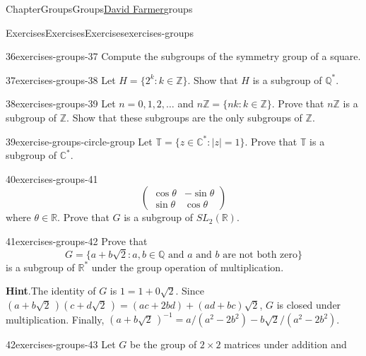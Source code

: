 \documentclass[oneside,10pt,]{book}
\newcommand{\blocktitlefont}{\relax}
\numberwithin{equation}{section}
\begin{document}
\begin{chapterptx}{Chapter}{Groups}{}{Groups}{\hyperlink{dfarmer}{David Farmer}}{}{groups}
\begin{exercises-section}{Exercises}{Exercises}{}{Exercises}{}{}{exercises-groups}
\begin{divisionexercise}{36}{}{}{exercises-groups-37}
Compute the subgroups of the symmetry group of a square.%
\end{divisionexercise}%
\begin{divisionexercise}{37}{}{}{exercises-groups-38}%
Let \(H = \{2^k : k \in {\mathbb Z} \}\). Show that \(H\) is a subgroup of \({\mathbb Q}^*\).%
\end{divisionexercise}%
\begin{divisionexercise}{38}{}{}{exercises-groups-39}%
Let \(n = 0, 1, 2, \ldots\) and \(n {\mathbb Z} = \{ nk : k \in  {\mathbb Z} \}\). Prove that \(n {\mathbb Z}\) is a subgroup of \({\mathbb Z}\).  Show that these subgroups are the only subgroups of \(\mathbb{Z}\).%
\end{divisionexercise}%
\begin{divisionexercise}{39}{}{}{exercise-groups-circle-group}%
Let \({\mathbb T} = \{ z \in  {\mathbb C}^* : |z| =1 \}\). Prove that \({\mathbb T}\) is a subgroup of \({\mathbb C}^*\).%
\end{divisionexercise}%
\begin{divisionexercise}{40}{}{}{exercises-groups-41}%
%
\begin{equation*}
\begin{pmatrix}
\cos \theta & -\sin \theta \\
\sin \theta & \cos \theta
\end{pmatrix}
\end{equation*}
where \(\theta \in {\mathbb R}\). Prove that \(G\) is a subgroup of \(SL_2({\mathbb R})\).%
\end{divisionexercise}%
\begin{divisionexercise}{41}{}{}{exercises-groups-42}%
Prove that%
\begin{equation*}
G = \{ a + b \sqrt{2} : a, b \in {\mathbb Q} \text{ and } a \text{ and } b \text{ are not both zero} \}
\end{equation*}
is a subgroup of \({\mathbb R}^{\ast}\) under the group operation of multiplication.%
\par\smallskip%
\noindent\textbf{\blocktitlefont Hint}.\hypertarget{exercises-groups-42-2}{}\quad{}The identity of \(G\) is \(1 = 1 + 0 \sqrt{2}\). Since \((a + b \sqrt{2}\, )(c + d \sqrt{2}\, ) = (ac + 2bd) + (ad + bc)\sqrt{2}\), \(G\) is closed under multiplication.  Finally,  \((a + b \sqrt{2}\, )^{-1} = a/(a^2 - 2b^2) - b\sqrt{2}/(a^2 - 2 b^2)\).%
\end{divisionexercise}%
\begin{divisionexercise}{42}{}{}{exercises-groups-43}%
Let \(G\) be the group of \(2 \times 2\) matrices under addition and%

\end{divisionexercise}
\end{exercises-section}
\end{chapterptx}
\end{document}
